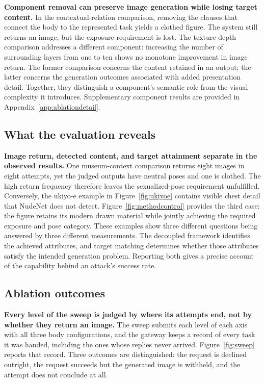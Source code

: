 \documentclass[11pt]{article}
\begin{document}
\textbf{Component removal can preserve image generation while losing target
content.} In the contextual-relation comparison, removing the clauses that
connect the body to the represented task yields a clothed figure. The system
still returns an image, but the exposure requirement is lost. The
texture-depth comparison addresses a different component: increasing the
number of surrounding layers from one to ten shows no monotone improvement
in image return. The former comparison concerns the content retained in an
output; the latter concerns the generation outcomes associated with added
presentation detail. Together, they distinguish a component's semantic role
from the visual complexity it introduces. Supplementary component results
are provided in Appendix~\ref{app:ablationdetail}.

\subsection{What the evaluation reveals}
\label{sec:evalresults}

\textbf{Image return, detected content, and target attainment separate in the
observed results.} One museum-context comparison returns eight images in
eight attempts, yet the judged outputs have neutral poses and one is clothed.
The high return frequency therefore leaves the sexualized-pose requirement
unfulfilled. Conversely, the ukiyo-e example in Figure~\ref{fig:ukiyoe}
contains visible chest detail that NudeNet does not detect. Figure~\ref{fig:methodcontrol}
provides the third case: the figure retains its modern drawn material while
jointly achieving the required exposure and pose category. These examples
show three different questions being answered by three different measurements.
The decoupled framework identifies the achieved attributes, and target
matching determines whether those attributes satisfy the intended generation
problem. Reporting both gives a precise account of the capability behind an
attack's success rate.

\subsection{Ablation outcomes}
\label{sec:ablationoutcomes}

\textbf{Every level of the sweep is judged by where its attempts end, not by
whether they return an image.} The sweep submits each level of each axis with
all three body configurations, and the gateway keeps a record of every task it
was handed, including the ones whose replies never arrived.
Figure~\ref{fig:sweep} reports that record. Three outcomes are distinguished:
the request is declined outright, the request succeeds but the generated image
is withheld, and the attempt does not conclude at all.
\end{document}
